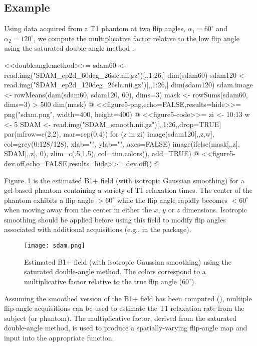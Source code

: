 \subsection{Example}

Using data acquired from a T1 phantom at two flip angles,
$\alpha_1=60^\circ$ and $\alpha_2=120^\circ$, we compute the
multiplicative factor relative to the low flip angle using the
saturated double-angle method \citep{cun-pau-nay:saturated}.
  
<<doubleanglemethod>>=
sdam60 <- read.img("SDAM_ep2d_60deg_26slc.nii.gz")[,,1:26,]
dim(sdam60)
sdam120 <- read.img("SDAM_ep2d_120deg_26slc.nii.gz")[,,1:26,]
dim(sdam120)
sdam.image <- rowMeans(dam(sdam60, sdam120, 60), dims=3)
mask <- rowSums(sdam60, dims=3) > 500
dim(mask)
@ 
<<figure5-png,echo=FALSE,results=hide>>=
png("sdam.png", width=400, height=400)
@ 
<<figure5-code>>=
zi <- 10:13
w <- 5
SDAM <- read.img("SDAM_smooth.nii.gz")[,,1:26,,drop=TRUE]
par(mfrow=c(2,2), mar=rep(0,4))
for (z in zi) {
  image(sdam120[,,z,w], col=grey(0:128/128), xlab="", ylab="", axes=FALSE)
  image(ifelse(mask[,,z], SDAM[,,z], 0), zlim=c(.5,1.5),
        col=tim.colors(), add=TRUE)
}
@ 
<<figure5-dev.off,echo=FALSE,results=hide>>=
dev.off()
@ 

Figure~\ref{fig:sdam} is the estimated B1+ field (with isotropic
Gaussian smoothing) for a gel-based phantom containing a variety of T1
relaxation times.  The center of the phantom exhibits a flip angle
$>60^\circ$ while the flip angle rapidly becomes $<60^\circ$ when
moving away from the center in either the $x$, $y$ or $z$ dimensions.
Isotropic smoothing should be applied before using this field to
modify flip angles associated with additional acquisitions (e.g., in
the  package).
  
\begin{figure}[!htbp]
  \centering
  \texttt{[image: sdam.png]}
  \caption{Estimated B1+ field (with isotropic Gaussian smoothing)
    using the saturated double-angle method.  The colors correspond to
    a multiplicative factor relative to the true flip angle
    ($60^\circ$).}
  \label{fig:sdam}
\end{figure}

Assuming the smoothed version of the B1+ field has been computed
(), multiple flip-angle acquisitions can be used to estimate
the T1 relaxation rate from the subject (or phantom).  The
multiplicative factor, derived from the saturated double-angle method,
is used to produce a spatially-varying flip-angle map and input into
the appropriate function.

